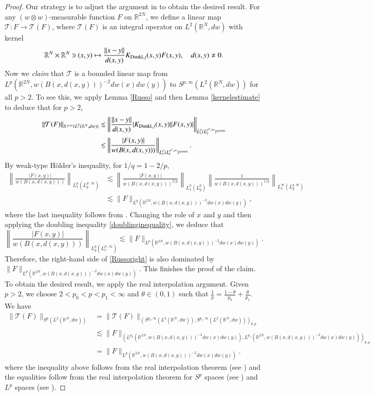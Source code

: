 \documentclass[12pt]{amsart}
\begin{document}
\begin{proof}
Our strategy is to adjust the argument in \cite[Proposition 11.8]{HKarxiv} to obtain the desired result.
For any $(w\otimes w)$-measurable function $F$ on $\mathbb{R}^{2N}$, we define a linear map $\mathcal{T}:F\rightarrow \mathcal{T}(F)$, where $\mathcal{T}(F)$ is an integral operator on $L^2(\mathbb{R}^N,dw)$ with kernel
$$\mathbb{R}^N\times\mathbb{R}^N\ni(x,y)\mapsto \frac{\|x-y\|}{d(x,y)}K_{{\rm Dunkl},j}(x,y)F(x,y),\quad d(x,y)\neq 0.$$
Now we {\it claim} that $\mathcal{T}$ is a bounded linear map from $L^p(\mathbb{R}^{2N},w(B(x,d(x,y)))^{-2}dw(x)dw(y))$ to $S^{p,\infty}(L^2(\mathbb{R}^N,dw))$ for all $p>2$. To see this, we apply Lemma \ref{Russo} and then Lemma \ref{kernelestimate} to deduce that for $p>2$,
\begin{align}\label{Russoright}
  \|\mathcal{T}(F)\|_{S^{p,\infty}(L^2(\mathbb{R}^N,dw))}&\lesssim\left\|\frac{\|x-y\|}{d(x,y)}|K_{{\rm Dunkl},j}(x,y)||F(x,y)|\right\|_{L_x^p(L_y^{p',\infty})^{\rm symm}}\nonumber\\&\lesssim \left\|\frac{|F(x,y)|}{w(B(x,d(x,y)))}\right\|_{L_x^p(L_y^{p',\infty})^{\rm symm}}.
\end{align}
By weak-type H\"{o}lder's inequality, for $1/q=1-2/p$,
\begin{align}\label{beforeinterpolation}
\left\|\frac{|F(x,y)|}{w(B(x,d(x,y)))}\right\|_{L_x^p(L_y^{p',\infty})}&\lesssim\left\|\frac{|F(x,y)|}{w(B(x,d(x,y)))^{2/p}}\right\|_{L_x^p(L_y^p)}\left\|\frac{1}{w(B(x,d(x,y)))^{1/q}}\right\|_{L_x^\infty( L_y^{q,\infty})}\nonumber\\
&\lesssim \|F\|_{L^p(\mathbb{R}^{2N},w(B(x,d(x,y)))^{-2}dw(x)dw(y))},
\end{align}
where the last inequality follows from \cite[Lemma 11.7]{HKarxiv}. Changing the role of $x$ and $y$ and then applying the doubling inequality \eqref{doublinginequality}, we deduce that
$$\left\|\frac{|F(x,y)|}{w(B(x,d(x,y)))}\right\|_{L_y^p(L_x^{p',\infty})}\lesssim \|F\|_{L^p(\mathbb{R}^{2N},w(B(x,d(x,y)))^{-2}dw(x)dw(y))}.$$
Therefore, the right-hand side of \eqref{Russoright} is also dominated by $\|F\|_{L^p(\mathbb{R}^{2N},w(B(x,d(x,y)))^{-2}dw(x)dw(y))}$.
This finishes the proof of the claim. To obtain the desired result, we apply the real interpolation argument. Given $p>2$, we choose $2<p_0<p<p_1<\infty$ and $\theta\in (0,1)$ such that $\frac{1}{p}=\frac{1-\theta}{p_0}+\frac{\theta}{p_1}$. We have
\begin{align}\label{beforetaking}
\|\mathcal{T}(F)\|_{S^{p}(L^2(\mathbb{R}^N,dw))}
&=\|\mathcal{T}(F)\|_{(S^{p_0,\infty}(L^2(\mathbb{R}^N,dw)),S^{p_1,\infty}(L^2(\mathbb{R}^N,dw)))_{\theta,p}}\nonumber\\
&\lesssim \|F\|_{(L^{p_0}(\mathbb{R}^{2N},w(B(x,d(x,y)))^{-2}dw(x)dw(y)),L^{p_1}(\mathbb{R}^{2N},w(B(x,d(x,y)))^{-2}dw(x)dw(y)))_{\theta,p}}\nonumber\\
&=\|F\|_{L^p(\mathbb{R}^{2N},w(B(x,d(x,y)))^{-2}dw(x)dw(y))}.
\end{align}
where the inequality above follows from the real interpolation theorem (see \cite[Theorem 3.11.8]{Bergh}) and the equalities follow from the real interpolation theorem for $S^p$ spaces (see \cite[Th\'{e}or\`{e}m 2]{MR296684}) and $L^p$ spaces (see \cite[Theorem 5.2.1]{Bergh}).


\end{proof}
\end{document}
